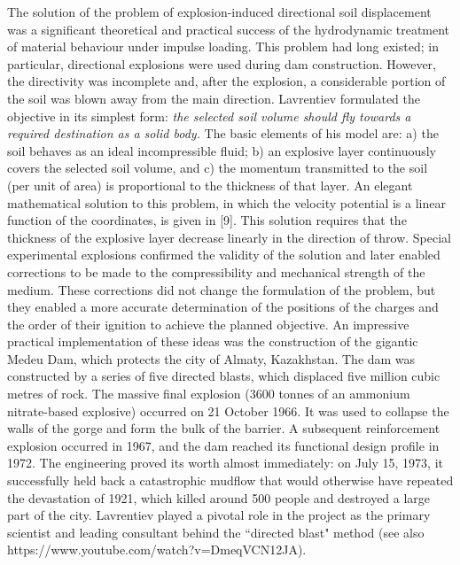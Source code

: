 \documentclass[%
 reprint,
onecolumn,
 amsmath,amssymb, aps,
]{revtex4-2}
\numberwithin{equation}{section}
\begin{document}
The solution of the problem of explosion-induced directional soil displacement was a significant theoretical and practical success of the hydrodynamic treatment of material behaviour under impulse loading.
This problem  had long existed;
in particular, directional explosions were used during dam construction.
However, the directivity was incomplete and, after the explosion, a considerable portion of the soil was blown away from the main direction.
Lavrentiev formulated the objective in its simplest form:
\textit{the selected soil volume should fly towards a required destination as a solid body.}
The basic elements of his model are: a) the soil behaves as an ideal incompressible fluid;
b) an explosive layer continuously covers the selected soil volume, and
c) the momentum transmitted to the soil (per unit of area) is proportional to the thickness of that layer.
An elegant mathematical solution to this problem, in which the velocity potential is a linear function of the coordinates, is given in [9].
This solution requires that the thickness of the explosive layer decrease linearly in the direction of throw.
Special experimental explosions confirmed the validity of the solution and later enabled corrections to be made to the compressibility and mechanical strength of the medium.
These corrections did not change the formulation of the problem, but they enabled a more accurate determination of the positions of the charges and the order of their ignition to achieve the planned objective.
An impressive practical implementation of these ideas was the construction of the gigantic Medeu Dam, which protects the city of Almaty, Kazakhstan.
The dam was constructed by a series of five directed blasts, which displaced five million cubic metres of rock.
The massive final explosion (3600 tonnes of an ammonium nitrate-based explosive) occurred on 21 October 1966.
It was used to collapse the walls of the gorge and form the bulk of the barrier.
A subsequent reinforcement explosion occurred in 1967, and the dam reached its functional design profile in 1972.
The engineering proved its worth almost immediately: on July 15, 1973, it successfully held back a catastrophic mudflow that would otherwise have repeated the devastation of 1921, which killed around 500 people and destroyed a large part of the city.
Lavrentiev played a pivotal role in the project as the primary scientist and leading consultant behind the ``directed blast" method
(see also https://www.youtube.com/watch?v=DmeqVCN12JA).

\vspace{3mm}
\end{document}
